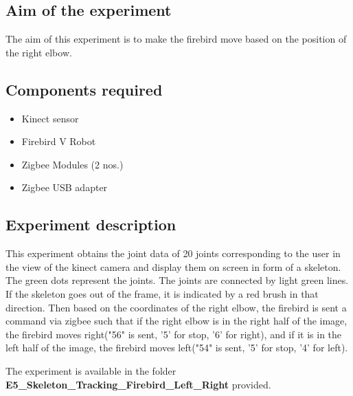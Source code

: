 \begin{flushleft}
\medskip
\subsection{\textbf{ Aim of the experiment}}
The aim of this experiment is to make the firebird move based on the position of the right elbow.
\medskip

\subsection{\textbf{ Components required}}
\begin{itemize}
\item Kinect sensor
\item Firebird V Robot
\item Zigbee Modules (2 nos.)
\item Zigbee USB adapter
\end{itemize}
\medskip

\subsection{\textbf{ Experiment description}}
This experiment obtains the joint data of 20 joints corresponding to the user in the view of the kinect camera and display them on screen in form of a skeleton. The green dots represent the joints. The joints are connected by light green lines. If the skeleton goes out of the frame, it is indicated by a red brush in that direction. Then based on the coordinates of the right elbow, the firebird is sent a command via zigbee such that if the right elbow is in the right half of the image, the firebird moves right("56" is sent, '5' for stop, '6' for right), and if it is in the left half of the image, the firebird moves left("54" is sent, '5' for stop, '4' for left).

\medskip
The experiment is available in the folder \textbf{E5\_Skeleton\_Tracking\_Firebird\_Left\_Right} provided.
\medskip


\end{flushleft}
